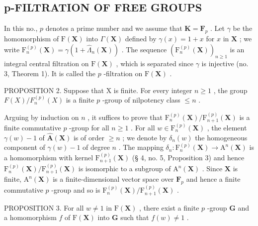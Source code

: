 \subsection{p-FILTRATION OF FREE GROUPS}

In this no., \(p\) denotes a prime number and we assume that \(\mathbf{K} = \mathbf{F}_p\) . Let \(\gamma\) be the homomorphism of \(\mathrm{F}(\mathbf{X})\) into \(\Gamma(\mathbf{X})\) defined by \(\gamma(x) = 1 + x\) for \(x\) in \(\mathbf{X}\) ; we write \(\mathrm{F}_n^{(p)}(\mathbf{X}) = \gamma(1 + \hat{\Lambda}_n(\mathbf{X}))\) . The sequence \((\mathrm{F}_n^{(p)}(\mathbf{X}))_{n\geq 1}\) is an integral central filtration on \(\mathrm{F}(\mathbf{X})\) , which is separated since \(\gamma\) is injective (no. 3, Theorem 1). It is called the \(p\) -filtration on \(\mathrm{F}(\mathbf{X})\) .

PROPOSITION 2. Suppose that X is finite. For every integer \(n \geqslant 1\) , the group \(F(X) / F_n^{(p)}(X)\) is a finite \(p\) -group of nilpotency class \(\leqslant n\) .

Arguing by induction on \(n\) , it suffices to prove that \(\mathrm{F}_{n}^{(p)}(\mathbf{X}) / \mathrm{F}_{n + 1}^{(p)}(\mathbf{X})\) is a finite commutative \(p\) -group for all \(n \geqslant 1\) . For all \(w \in \mathrm{F}_{n}^{(p)}(\mathbf{X})\) , the element \(\gamma(w) - 1\) of \(\hat{\mathbf{A}}(\mathbf{X})\) is of order \(\geqslant n\) ; we denote by \(\delta_n(w)\) the homogeneous component of \(\gamma(w) - 1\) of degree \(n\) . The mapping \(\delta_n: \mathrm{F}_{n}^{(p)}(\mathbf{X}) \to \mathrm{A}^n (\mathbf{X})\) is a homomorphism with kernel \(\mathrm{F}_{n + 1}^{(p)}(\mathbf{X})\) (§ 4, no. 5, Proposition 3) and hence \(\mathrm{F}_{n}^{(p)}(\mathbf{X}) / \mathrm{F}_{n + 1}^{(p)}(\mathbf{X})\) is isomorphic to a subgroup of \(\mathrm{A}^n (\mathbf{X})\) . Since \(\mathbf{X}\) is finite, \(\mathrm{A}^n (\mathbf{X})\) is a finite-dimensional vector space over \(\mathbf{F}_p\) and hence a finite commutative \(p\) -group and so is \(\mathrm{F}_{n}^{(p)}(\mathbf{X}) / \mathrm{F}_{n + 1}^{(p)}(\mathbf{X})\) .

PROPOSITION 3. For all \(w \neq 1\) in \(\mathrm{F}(\mathbf{X})\) , there exist a finite \(p\) -group \(\mathbf{G}\) and a homomorphism \(f\) of \(\mathrm{F}(\mathbf{X})\) into \(\mathbf{G}\) such that \(f(w) \neq 1\) .

